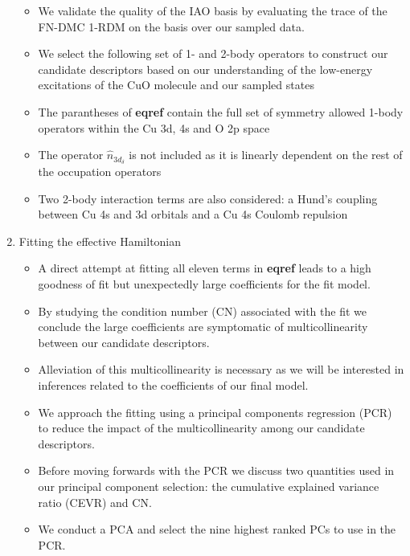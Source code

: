 \documentclass{article}
\begin{document}
\begin{enumerate}
\begin{itemize}
\item We validate the quality of the IAO basis by evaluating the trace of the FN-DMC 1-RDM on the basis over our sampled data.

\item We select the following set of 1- and 2-body operators to construct our candidate descriptors based on our understanding of the low-energy excitations of the CuO molecule and our sampled states

\item The parantheses of \textbf{eqref} contain the full set of symmetry allowed 1-body operators within the Cu 3d, 4s and O 2p space

\item The operator $\hat{n}_{3d_\delta}$ is not included as it is linearly dependent on the rest of the occupation operators

\item Two 2-body interaction terms are also considered: a Hund's coupling between Cu 4s and 3d orbitals and a Cu 4s Coulomb repulsion
\end{itemize}

\item Fitting the effective Hamiltonian 
\begin{itemize}
\item {A direct attempt at fitting all eleven terms in \textbf{eqref} leads to a high goodness of fit but unexpectedly large coefficients for the fit model.}

\item {By studying the condition number (CN) associated with the fit we conclude the large coefficients are symptomatic of multicollinearity between our candidate descriptors.}

\item {Alleviation of this multicollinearity is necessary as we will be interested in inferences related to the coefficients of our final model.}

\item {We approach the fitting using a principal components regression (PCR) to reduce the impact of the multicollinearity among our candidate descriptors.}

\item {Before moving forwards with the PCR we discuss two quantities used in our principal component selection: the cumulative explained variance ratio (CEVR) and CN.}

\item {We conduct a PCA and select the nine highest ranked PCs to use in the PCR.}


\end{itemize}
\end{enumerate}
\end{document}
